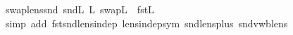 \begin{isabellebody}
\endisatagproof
{\isafoldproof}%
%
\isadelimproof
\isanewline
%
\endisadelimproof
\isanewline
{}\isamarkupfalse%
\ swap{\isacharunderscore}lens{\isacharunderscore}snd{\isacharcolon}\ {\isachardoublequoteopen}snd\isactrlsub L\ {\isacharsemicolon}\isactrlsub L\ swap\isactrlsub L\ {\isacharequal}\ fst\isactrlsub L{\isachardoublequoteclose}\isanewline
%
\isadelimproof
\ \ %
\endisadelimproof
%
\isatagproof
{}\isamarkupfalse%
\ {\isacharparenleft}simp\ add{\isacharcolon}\ fst{\isacharunderscore}snd{\isacharunderscore}lens{\isacharunderscore}indep\ lens{\isacharunderscore}indep{\isacharunderscore}sym\ snd{\isacharunderscore}lens{\isacharunderscore}plus\ snd{\isacharunderscore}vwb{\isacharunderscore}lens{\isacharparenright}%
\endisatagproof
{\isafoldproof}%
%
\isadelimproof
\isanewline
%
\endisadelimproof
%
\isadelimtheory
\ \ \isanewline
%
\endisadelimtheory
%
\isatagtheory
{}\isamarkupfalse%
%
\endisatagtheory
{\isafoldtheory}%
%
\isadelimtheory
%
\endisadelimtheory
%
\end{isabellebody}%
